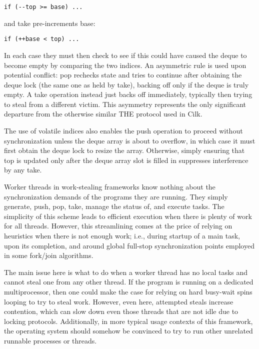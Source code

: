 \begin{lstlisting}
if (--top >= base) ...
\end{lstlisting}

and take pre-increments base:

\begin{lstlisting}
if (++base < top) ...
\end{lstlisting}

In each case they must then check to see if this could have caused the
deque to become empty by comparing the two indices. An asymmetric rule
is used upon potential conflict: pop rechecks state and tries to
continue after obtaining the deque lock (the same one as held by
take), backing off only if the deque is truly empty. A take operation
instead just backs off immediately, typically then trying to steal
from a different victim. This asymmetry represents the only
significant departure from the otherwise similar THE protocol used in
Cilk.

The use of volatile indices also enables the push operation to proceed
without synchronization unless the deque array is about to overflow,
in which case it must first obtain the deque lock to resize the
array. Otherwise, simply ensuring that top is updated only after the
deque array slot is filled in suppresses interference by any take.


Worker threads in work-stealing frameworks know nothing about the
synchronization demands of the programs they are running. They simply
generate, push, pop, take, manage the status of, and execute
tasks. The simplicity of this scheme leads to efficient execution when
there is plenty of work for all threads. However, this streamlining
comes at the price of relying on heuristics when there is not enough
work; i.e., during startup of a main task, upon its completion, and
around global full-stop synchronization points employed in some
fork/join algorithms.

The main issue here is what to do when a worker thread has no local
tasks and cannot steal one from any other thread. If the program is
running on a dedicated multiprocessor, then one could make the case
for relying on hard busy-wait spins looping to try to steal
work. However, even here, attempted steals increase contention, which
can slow down even those threads that are not idle due to locking
protocols.  Additionally, in more typical usage contexts of this
framework, the operating system should somehow be convinced to try to
run other unrelated runnable processes or threads.

